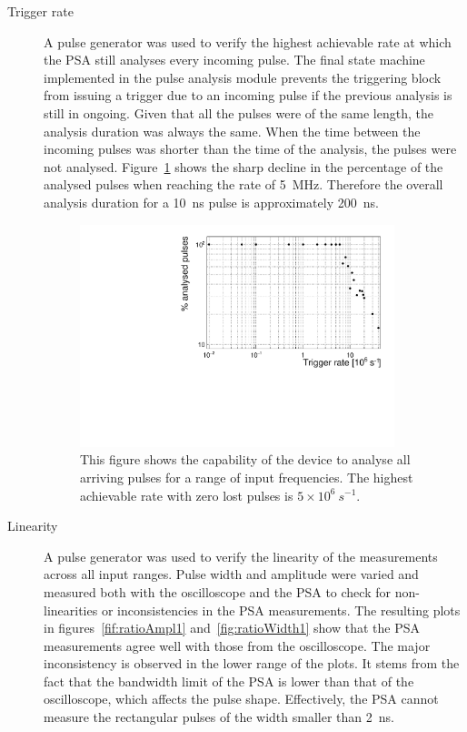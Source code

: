 \documentclass[12pt]{packages/mytustyle}  %
\begin{document}
\begin{description}
\item[Trigger rate]
A pulse generator was used to verify the highest achievable rate at which the PSA still analyses every incoming pulse. The final state machine implemented in the pulse analysis module prevents the triggering block from issuing a trigger due to an incoming pulse if the previous analysis is still in ongoing. Given that all the pulses were of the same length, the analysis duration was always the same. When the time between the incoming pulses was shorter than the time of the analysis, the pulses were not analysed. Figure~\ref{fig:trigrate} shows the sharp decline in the percentage of the analysed pulses when reaching the rate of 5~MHz. Therefore the overall analysis duration for a 10~ns pulse is approximately 200~ns.

\begin{figure}[!t]
\centering
\includegraphics[width=0.9\textwidth]{../../scripts/05_current_monitoring/PulseGenTests/plots/freq}
\caption{This figure shows the capability of the device to analyse all arriving pulses for a range of input frequencies. The highest achievable rate with zero lost pulses is $5\times10^6~s^{-1}$.}
\label{fig:trigrate}
\end{figure}

\item[Linearity]
A pulse generator was used to verify the linearity of the measurements across all input ranges. Pulse width and amplitude were varied and measured both with the oscilloscope and the PSA to check for non-linearities or inconsistencies in the PSA measurements. The resulting plots in figures~\ref{fif:ratioAmpl1} and~\ref{fig:ratioWidth1} show that the PSA measurements agree well with those from the oscilloscope. The major inconsistency is observed in the lower range of the plots. It stems from the fact that the bandwidth limit of the PSA is lower than that of the oscilloscope, which affects the pulse shape. Effectively, the PSA cannot measure the rectangular pulses of the width smaller than 2~ns.


\end{description}
\end{document}
